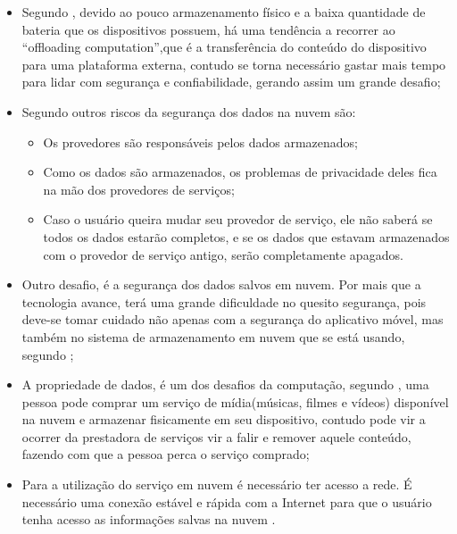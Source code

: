 \documentclass[12pt]{article}
\begin{document}
\begin{itemize}
 \item Segundo \cite{kumar2014}, devido ao pouco armazenamento físico e a baixa quantidade de bateria que os dispositivos
 possuem, há uma tendência a recorrer ao “offloading computation”,que é a transferência do conteúdo do dispositivo para uma
 plataforma externa, contudo se torna necessário gastar mais tempo para lidar com segurança e confiabilidade, gerando assim um
 grande desafio;

  \item Segundo \cite{gao13} outros riscos da segurança dos dados na nuvem são:

    \begin{itemize}
      \item Os provedores são responsáveis pelos dados armazenados;
      \item Como os dados são armazenados, os problemas de privacidade deles fica na mão dos provedores de serviços;
      \item Caso o usuário queira mudar seu provedor de serviço, ele não saberá se todos os dados estarão completos, e se os
      dados que estavam armazenados com o provedor de serviço antigo, serão completamente apagados.
    \end{itemize}


 \item Outro desafio, é a segurança dos dados salvos em nuvem. Por mais que a tecnologia avance, terá uma grande dificuldade no
 quesito segurança, pois deve-se tomar cuidado não apenas com a segurança do aplicativo móvel, mas também no sistema de
 armazenamento em nuvem que se está usando, segundo \cite{kumar2014};

 \item A propriedade de dados, é um dos desafios da computação, segundo \cite{alizadeh2013}, uma pessoa pode comprar um serviço
 de mídia(músicas, filmes e vídeos) disponível na nuvem e armazenar fisicamente em seu dispositivo, contudo pode vir a ocorrer da
 prestadora de serviços vir a falir e remover aquele conteúdo, fazendo com que a pessoa perca o serviço comprado;

 \item Para a utilização do serviço em nuvem é necessário ter acesso a rede. É necessário uma conexão estável e rápida com a
 Internet para que o usuário tenha acesso as informações salvas na nuvem \cite{alizadeh2013}.

\end{itemize}
\end{document}
